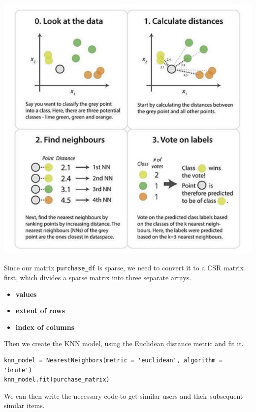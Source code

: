\documentclass{article}
\begin{document}
\begin{center}
\includegraphics[scale=0.45]{02.png}
\end{center}

Since our matrix \texttt{purchase\_df} is sparse, we need to convert it to a CSR matrix first, which divides a sparse matrix into three separate arrays.

\begin{itemize}
    \item{\textbf{values}}
    \item{\textbf{extent of rows}}
    \item{\textbf{index of columns}}
\end{itemize}

Then we create the KNN model, using the Euclidean distance metric and fit it.

\begin{lstlisting}
knn_model = NearestNeighbors(metric = 'euclidean', algorithm = 'brute')
knn_model.fit(purchase_matrix)
\end{lstlisting}

We can then write the necessary code to get similar users and their subsequent similar items.
\end{document}
